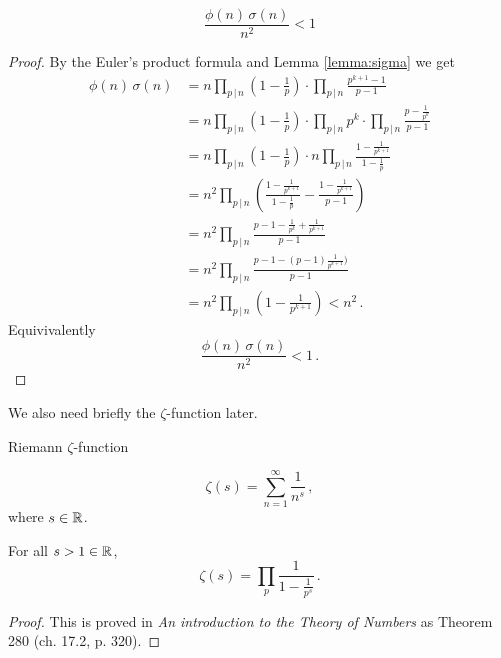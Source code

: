 \documentclass{article}
\begin{document}
\begin{lemma}
\label{thm:sigmafii}
\begin{equation*}
    \frac{\phi(n)\,\sigma(n)}{n^2}<1
\end{equation*}

\begin{proof}
By the Euler's product formula and Lemma \ref{lemma:sigma} we get
\begin{align*}
    \phi(n)\,\sigma(n) & = n\prod_{p\,\vert\, n}\left(1-\frac{1}{p}\right) \cdot \prod_{p\,\vert\, n} \frac{p^{k+1}-1}{p-1}\\
    & = n\prod_{p\,\vert\, n}\left(1-\frac{1}{p}\right) \cdot \prod_{p\,\vert\, n} p^k \cdot \prod_{p\,\vert\, n} \frac{p-\frac{1}{p^k}}{p-1}\\
    & = n\prod_{p\,\vert\, n}\left(1-\frac{1}{p}\right) \cdot n \prod_{p\,\vert\, n}\frac{1-\frac{1}{p^{k+1}}}{1-\frac{1}{p}}\\
    & = n^2 \prod_{p\,\vert\, n} \left( \frac{1-\frac{1}{p^{k+1}}}{1-\frac{1}{p}} - \frac{1-\frac{1}{p^{k+1}}}{p-1}\right)\\
    & = n^2 \prod_{p\,\vert\, n} \frac{p-1-\frac{1}{p^k}+\frac{1}{p^{k+1}}}{p-1}\\
    & = n^2 \prod_{p\,\vert\, n} \frac{p-1-(p-1)\frac{1}{p^{k+1}})}{p-1}\\
    & = n^2 \prod_{p\,\vert\, n} \left(1-\frac{1}{p^{k+1}}\right) < n^2\,.
\end{align*}
Equivivalently
\begin{equation*}
    \frac{\phi(n)\,\sigma(n)}{n^2}<1\,.
\end{equation*}
\end{proof}
\end{lemma}

We also need briefly the $\zeta$-function later.

\begin{definition}
Riemann $\zeta$-function \emph{\cite{HardyWright}}

\begin{equation*}
    \zeta(s)=\sum_{n=1}^\infty \frac{1}{n^s}\,,
\end{equation*}
where $s\in\mathbb{R}$.
\end{definition}

\begin{lemma}
\label{lemma:zeta}
For all $s>1\in\mathbb{R}$, 
\begin{equation*}
    \zeta(s)=\prod_p \frac{1}{1-\frac{1}{p^s}}\,.
\end{equation*}
\begin{proof}
This is proved in \textit{An introduction to the Theory of Numbers} \cite{HardyWright} as Theorem 280 (ch. 17.2, p. 320).
\end{proof}
\end{lemma}
\end{document}
